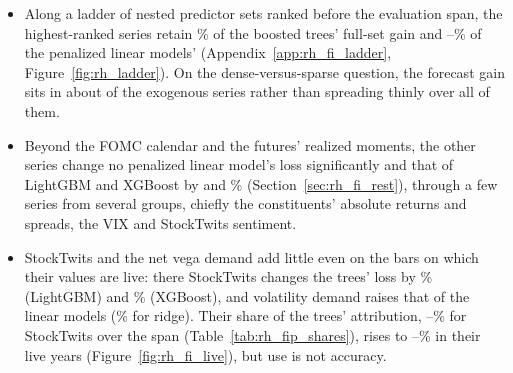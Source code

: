 \begin{itemize}
\begin{enumerate}
\begin{itemize}
    \item Along a ladder of nested predictor sets ranked before the evaluation span, the \ladderEBTopK{}
      highest-ranked series retain \ladderEBTreeRetainRng{}\% of the boosted trees' full-set gain and
      \rhldEBLinRTenMin{}--\rhldEBLinRTenMax{}\% of the penalized linear models' (Appendix~\ref{app:rh_fi_ladder},
      Figure~\ref{fig:rh_ladder}). On the dense-versus-sparse question, the forecast gain sits in about
      \ladderEBTopK{} of the \rhldEBNSeries{} exogenous series rather than spreading thinly over all of them.
    \item Beyond the FOMC calendar and the futures' realized moments, the other \rhbyFLNSeries{} series change no
      penalized linear model's loss significantly and that of LightGBM and XGBoost by
      \rhabLgbmFullVsAddRmFomcAllPct{} and \rhabXgbFullVsAddRmFomcAllPct\% (Section~\ref{sec:rh_fi_rest}), through a
      few series from several groups, chiefly the constituents' absolute returns and spreads, the VIX and
      StockTwits sentiment.
    \item StockTwits and the net vega demand add little even on the bars on which their values are live: there
      StockTwits changes
      the trees' loss by \rhabLgbmAddSentLiveSentPct\% (LightGBM) and \rhabXgbAddSentLiveSentPct\% (XGBoost), and
      volatility demand raises that of the linear models (\rhabRidgeAddVdLiveVdPct\% for ridge). Their share of the
      trees' attribution, \rhfipSentMin--\rhfipSentMax\% for StockTwits over the span (Table~\ref{tab:rh_fip_shares}),
      rises to \rhfilStwLiveMin--\rhfilStwLiveMax\% in their live years (Figure~\ref{fig:rh_fi_live}), but use is not
      accuracy.
    \end{itemize}

\end{enumerate}
\end{itemize}
